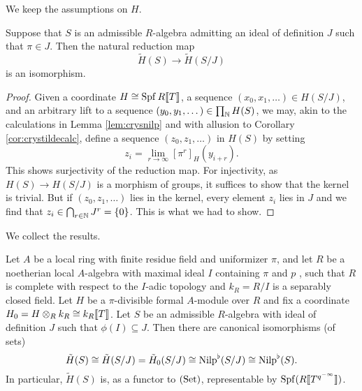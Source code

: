 \documentclass[../main.tex]{subfiles}
\begin{document}
We keep the assumptions on $H$.
\begin{lem}
  Suppose that $S$ is an admissible $R$-algebra admitting an ideal of definition
  $J$ such that $\pi \in J$. Then the natural reduction map
  \begin{equation*}
    \tilde H(S) \to \tilde H(S/J)
  \end{equation*}
  is an isomorphism.
  \begin{proof}[Proof]
    Given a coordinate $H \cong \operatorname{Spf} R\llbracket T \rrbracket$, a sequence $(x_0, x_1,
    \dots) \in H(S/J)$, and an arbitrary lift to a sequence $(y_0, y_1, \dots)
    \in \prod_{\mathbb{N}} H(S)$, we may, akin to
    the calculations in Lemma \ref{lem:crysnilp} and with allusion to Corollary
    \ref{cor:crystildecalc}, define a sequence $(z_0, z_1, \dots)$ in
    $H(S)$ by setting 
    \begin{equation*}
      z_i = \lim_{r \to \infty} [\pi^r]_{H}(y_{i+r}).
    \end{equation*}
    This shows surjectivity of the reduction map. For injectivity,
    as $H(S) \to H(S/J)$ is a morphism of groups, it suffices to show that the kernel
    is trivial. But if $(z_0, z_1, \dots)$ lies in the kernel, every element 
    $z_i$ lies in $J$ and we find that $z_i \in \bigcap_{r \in \mathbb{N}} J^r = \{0\}$.
    This is what we had to show.
  \end{proof}
\end{lem}

We collect the results. 
\begin{prop}
  Let $A$ be a local ring with finite residue field and uniformizer $\pi$, and
  let $R$ be a noetherian local
  $A$-algebra with maximal ideal $I$ containing $\pi$ and $p$ , such that 
  $R$ is complete with respect to the $I$-adic topology and $k_R = R/I$ is a 
  separably closed field.
  Let $H$ be a $\pi$-divisible formal
  $A$-module over $R$ and fix a coordinate $H_0 = H \otimes_R k_R \cong
  k_R \llbracket T \rrbracket$. 
  Let $S$ be an admissible $R$-algebra with ideal of definition $J$ such that 
  $\phi(I) \subseteq J$. Then there are canonical isomorphisms (of sets)
      \begin{equation*}
        \tilde H(S) \cong \tilde H(S/J) = \tilde H_0(S/J) \cong {\mathrm{Nilp}}^\flat(S/J) \cong
        {\mathrm{Nilp}}^\flat(S).
      \end{equation*}
  In particular, $\tilde H(S)$ is, as a functor to ${(\mathrm{Set})}$, representable by
  $\operatorname{Spf}(R \llbracket T^{q^{-\infty}} \rrbracket)$.
\end{prop}
\end{document}
